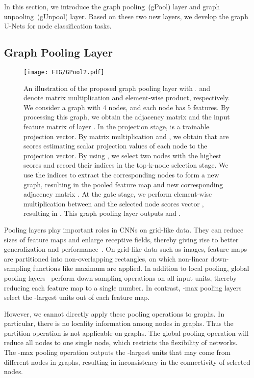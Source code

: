 \documentclass{article}
\begin{document}
In this section, we introduce the graph pooling~(gPool) layer and
graph unpooling~(gUnpool) layer. Based on these two new layers, we
develop the graph U-Nets for node classification tasks.

\subsection{Graph Pooling Layer}

\begin{figure*}[t] \texttt{[image: FIG/GPool2.pdf]}
\caption{An illustration of the proposed graph pooling layer with
.  and  denote matrix multiplication and
element-wise product, respectively. We consider a graph with 4
nodes, and each node has 5 features. By processing this graph, we
obtain the adjacency matrix  and
the input feature matrix  of
layer . In the projection stage,  is a trainable projection vector. By matrix multiplication and
, we obtain  that are scores estimating
scalar projection values of each node to the projection vector.
By using , we
select two nodes with the highest scores and record their indices in
the top-k-node selection stage. We use the indices to extract the
corresponding nodes to form a new graph, resulting in the pooled
feature map  and new corresponding adjacency matrix
. At the gate stage, we perform element-wise
multiplication between  and the selected node
scores vector , resulting in . This
graph pooling layer outputs  and .} \label{fig:gpool}
\end{figure*}

Pooling layers play important roles in CNNs on grid-like data. They
can reduce sizes of feature maps and enlarge receptive fields,
thereby giving rise to better generalization and
performance~\citep{yu2015multi}. On grid-like data such as images,
feature maps are partitioned into non-overlapping rectangles, on
which non-linear down-sampling functions like maximum are applied.
In addition to local pooling, global pooling
layers~\citep{zhao2015self} perform down-sampling operations on all
input units, thereby reducing each feature map to a single number.
In contrast, -max pooling layers~\citep{blunsom2014convolutional}
select the -largest units out of each feature map.

However, we cannot directly apply these pooling operations to
graphs. In particular, there is no locality information among nodes
in graphs. Thus the partition operation is not applicable on graphs. The
global pooling operation will reduce all nodes to one single node, which
restricts the flexibility of networks. The -max pooling operation
outputs the -largest units that may come from different nodes in graphs,
resulting in inconsistency in the connectivity of selected nodes.
\end{document}
